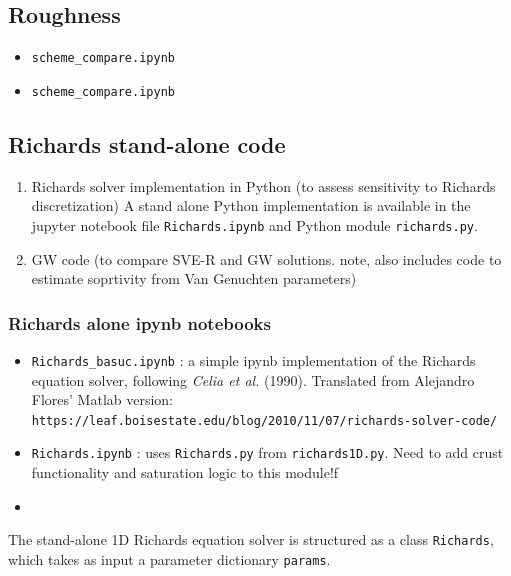 \documentclass{article}
\newcommand{\code}[1]{\texttt{#1}}
\begin{document}
\subsection{Roughness}
\begin{itemize}
	\item \code{scheme\_compare.ipynb}
	\item \code{scheme\_compare.ipynb}
\end{itemize}



\subsection{Richards stand-alone code}

\begin{enumerate}
	\item Richards solver implementation in Python (to assess sensitivity to Richards discretization) 
	\subitem  A stand alone Python implementation is available in the jupyter notebook file \code{Richards.ipynb} and Python module \code{richards.py}. 
 
	\item GW code (to compare SVE-R and GW solutions.  note, also includes code to estimate soprtivity from Van Genuchten parameters)
\end{enumerate}

\subsubsection*{Richards alone ipynb notebooks}
\begin{itemize}
	\item \code{Richards\_basuc.ipynb} : a simple ipynb implementation of the Richards equation solver, following \textit{Celia et al.} (1990).  Translated from Alejandro Flores' Matlab version:
	\subitem	\code{https://leaf.boisestate.edu/blog/2010/11/07/richards-solver-code/}
	\item \code{Richards.ipynb} : uses  \code{Richards.py} from \code{richards1D.py}.  Need to add crust functionality and saturation logic to this module!f
	\item 
\end{itemize}

The stand-alone 1D Richards equation solver is structured as a class \code{Richards}, which takes as input a parameter dictionary \code{params}. 



\end{document}
